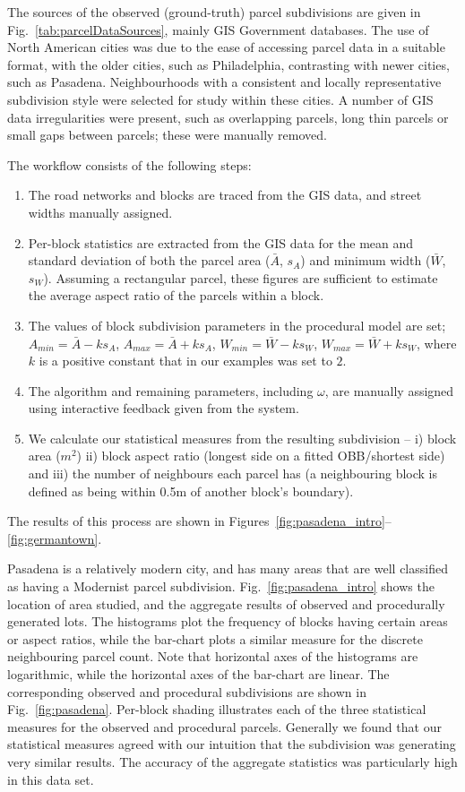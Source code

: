 The sources of the observed (ground-truth) parcel subdivisions are given in Fig.~\ref{tab:parcelDataSources}, mainly GIS Government databases. The use of North American cities was due to the ease of accessing parcel data in a suitable format, with the older cities, such as Philadelphia, contrasting with newer cities, such as Pasadena. Neighbourhoods with a consistent and locally representative subdivision style were selected for study within these cities.
 A number of GIS data irregularities were present, such as overlapping parcels, long thin parcels or small gaps between parcels; these were manually removed. 

The workflow consists of the following steps:
\begin{enumerate}
\item The road networks and blocks are traced from the GIS data, and street widths manually assigned.
\item Per-block statistics are extracted from the GIS data for the mean and standard deviation of both the parcel area ($\bar{A}$, $s_A$) and minimum width ($\bar{W}$, $s_W$). Assuming a rectangular parcel, these figures are sufficient to estimate the average aspect ratio of the parcels within a block.
\item The values of block subdivision parameters in the procedural model are set;  $A_{min} = \bar{A} - k s_A$, $A_{max} = \bar{A} + k s_A$,
$W_{min} = \bar{W} - k  s_W$, $W_{max} = \bar{W} + k s_W$, where $k$ is a positive constant that in our examples was set to $2$.
\item The algorithm and remaining parameters, including $\omega$, are manually assigned using interactive feedback given from the system.
\item We calculate our statistical measures from the resulting subdivision -- i) block area ($m^2$) ii) block aspect ratio (longest side on a fitted OBB/shortest side) and iii) the number of neighbours each parcel has (a neighbouring block is defined as being within 0.5m of another block's boundary).   
\end{enumerate}

The results of this process are shown in Figures~\ref{fig:pasadena_intro}--\ref{fig:germantown}.

Pasadena is a relatively modern city, and has many areas that are well classified as having a Modernist parcel subdivision. Fig.~\ref{fig:pasadena_intro} shows the location of area studied, and the aggregate results of observed and procedurally generated lots. The histograms plot the frequency of blocks having certain areas or aspect ratios, while the bar-chart plots a similar measure for the discrete neighbouring parcel count. Note that horizontal axes of the histograms are logarithmic, while the horizontal axes of the bar-chart are linear. The corresponding observed and procedural subdivisions are shown in Fig.~\ref{fig:pasadena}. Per-block shading illustrates each of the three statistical measures for the observed and procedural parcels. Generally we found that our statistical measures agreed with our intuition that the subdivision was generating very similar results. The accuracy of the aggregate statistics was particularly high in this data set. 


